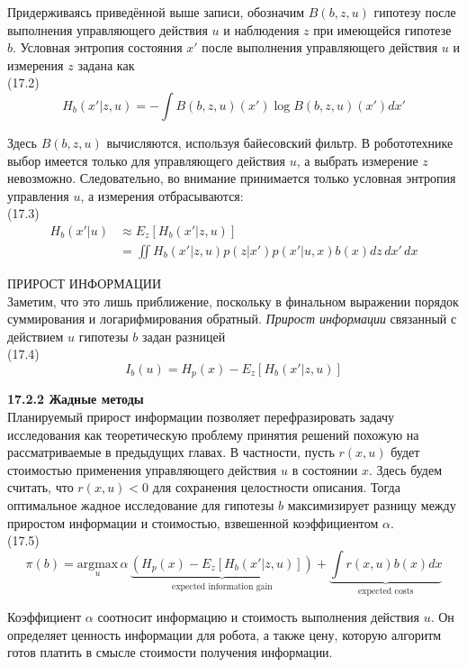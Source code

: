 \documentclass[10pt,a4paper]{article}
\begin{document}
Придерживаясь приведённой выше записи, обозначим $B(b, z, u)$ гипотезу после выполнения управляющего действия $u$ и наблюдения $z$ при имеющейся гипотезе $b$. Условная энтропия состояния $x'$ после выполнения управляющего действия $u$ и измерения $z$ задана как\\

(17.2)
$$H_b(x'|z,u)=-\int B(b,z,u)(x')\log B(b,z,u)(x')dx'$$

Здесь $B(b, z, u)$ вычисляются, используя байесовский фильтр. В робототехнике выбор имеется только для управляющего действия $u$, а выбрать измерение $z$ невозможно. Следовательно, во внимание принимается только условная энтропия управления $u$, а измерения отбрасываются:\\

(17.3)
\begin{equation*}
\begin{split}
H_b(x'|u)&\approx E_z[H_b(x'|z,u)]\\
&=\iint H_b(x'|z,u)p(z|x')p(x'|u,x)b(x)dz\,dx'\,dx
\end{split}
\end{equation*}

ПРИРОСТ ИНФОРМАЦИИ\\

Заметим, что это лишь приближение, поскольку в финальном выражении порядок суммирования и логарифмирования обратный. \textit{Прирост информации} связанный с действием $u$ гипотезы $b$ задан разницей\\

(17.4)
$$I_b(u)=H_p(x)-E_z[H_b(x'|z,u)]$$

\textbf{17.2.2	Жадные методы}\\

Планируемый прирост информации позволяет перефразировать задачу исследования как теоретическую проблему принятия решений похожую на рассматриваемые в предыдущих главах. В частности, пусть $r(x, u)$ будет стоимостью применения управляющего действия $u$ в состоянии $x$. Здесь будем считать, что $r(x, u)<0$ для сохранения целостности описания. Тогда оптимальное жадное исследование для гипотезы $b$ максимизирует разницу между приростом информации и стоимостью, взвешенной коэффициентом $\alpha$.\\

(17.5)
$$\pi(b)=\underset{u}{\text{argmax}}\,\alpha\,\underbrace{(H_p(x)-E_z[H_b(x'|z,u)])}_{\text{expected information gain}}+\underbrace{\int r(x,u)b(x)dx}_{\text{expected costs}}$$

Коэффициент $\alpha$ соотносит информацию и стоимость выполнения действия $u$. Он определяет ценность информации для робота, а также цену, которую алгоритм готов платить в смысле стоимости получения информации.
\end{document}
